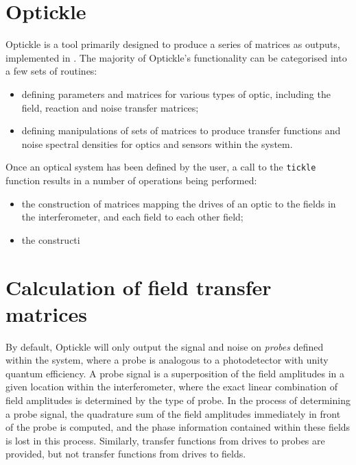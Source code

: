 \section{\label{sec:optickle-sim}Optickle}
Optickle is a tool primarily designed to produce a series of matrices as outputs, implemented in \MATLAB{}. The majority of Optickle's functionality can be categorised into a few sets of routines:

\begin{itemize}
  \item defining parameters and matrices for various types of optic, including the field, reaction and noise transfer matrices;
  \item defining manipulations of sets of matrices to produce transfer functions and noise spectral densities for optics and sensors within the system.
\end{itemize}

Once an optical system has been defined by the user, a call to the \lstinline!tickle! function results in a number of operations being performed:
\begin{itemize}
  \item the construction of matrices mapping the drives of an optic to the fields in the interferometer, and each field to each other field;
  \item the constructi
\end{itemize}

\section{\label{sec:optickle-field-tfs}Calculation of field transfer matrices}
By default, Optickle will only output the signal and noise on \emph{probes} defined within the system, where a probe is analogous to a photodetector with unity quantum efficiency. A probe signal is a superposition of the field amplitudes in a given location within the interferometer, where the exact linear combination of field amplitudes is determined by the type of probe. In the process of determining a probe signal, the quadrature sum of the field amplitudes immediately in front of the probe is computed, and the phase information contained within these fields is lost in this process. Similarly, transfer functions from drives to probes are provided, but not transfer functions from drives to fields.

